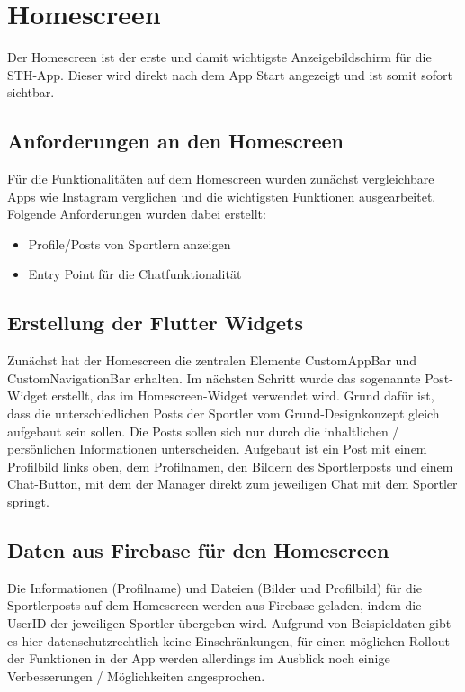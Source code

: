 \chapter{Homescreen}
Der Homescreen ist der erste und damit wichtigste Anzeigebildschirm für die STH-App. 
Dieser wird direkt nach dem App Start angezeigt und ist somit sofort sichtbar.
\section*{Anforderungen an den Homescreen}
Für die Funktionalitäten auf dem Homescreen wurden zunächst vergleichbare Apps wie Instagram verglichen und die wichtigsten Funktionen ausgearbeitet.\newline
Folgende Anforderungen wurden dabei erstellt:
\begin{itemize}
    \item Profile/Posts von Sportlern anzeigen
    \item Entry Point für die Chatfunktionalität
\end{itemize}

\section*{Erstellung der Flutter Widgets}
Zunächst hat der Homescreen die zentralen Elemente CustomAppBar und CustomNavigationBar erhalten.
Im nächsten Schritt wurde das sogenannte Post-Widget erstellt, das im Homescreen-Widget verwendet wird.
Grund dafür ist, dass die unterschiedlichen Posts der Sportler vom Grund-Designkonzept gleich aufgebaut sein sollen. 
Die Posts sollen sich nur durch die inhaltlichen / persönlichen Informationen unterscheiden.\newline
Aufgebaut ist ein Post mit einem Profilbild links oben, dem Profilnamen, den Bildern des Sportlerposts und einem Chat-Button, mit dem der Manager direkt zum jeweiligen Chat mit dem Sportler springt.

\section*{Daten aus Firebase für den Homescreen}
Die Informationen (Profilname) und Dateien (Bilder und Profilbild) für die Sportlerposts auf dem Homescreen werden aus Firebase geladen, indem die UserID der jeweiligen Sportler übergeben wird.
Aufgrund von Beispieldaten gibt es hier datenschutzrechtlich keine Einschränkungen, für einen möglichen Rollout der Funktionen in der App werden allerdings im Ausblick noch einige Verbesserungen / Möglichkeiten angesprochen.

